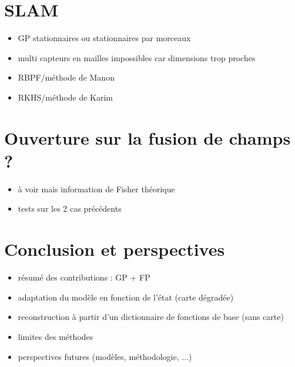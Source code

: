 \section{SLAM}

\begin{itemize}
	\item GP stationnaires ou stationnaires par morceaux
	\item multi capteurs en mailles impossibles car dimensions trop proches
	\item RBPF/méthode de Manon
	\item RKHS/méthode de Karim
\end{itemize}

\section{Ouverture sur la fusion de champs ?}

\begin{itemize}
	\item à voir mais information de Fisher théorique
	\item tests sur les 2 cas précédents
\end{itemize}

\section{Conclusion et perspectives}

\begin{itemize}
	\item résumé des contributions : GP + FP
	\item adaptation du modèle en fonction de l'état (carte dégradée)
	\item reconstruction à partir d'un dictionnaire de fonctions de base (sans carte)
	\item limites des méthodes
	\item perspectives futures (modèles, méthodologie, ...)
\end{itemize}
